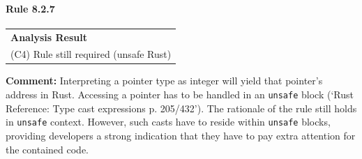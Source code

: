 \paragraph{Rule 8.2.7}
\begin{longtable}{p{13cm}}
\textbf{Analysis Result} \\
(C4) Rule still required (unsafe Rust) \\
\end{longtable}
\textbf{Comment:} Interpreting a pointer type as integer will yield that pointer's address in Rust. Accessing a pointer has to be handled in an \texttt{unsafe} block (`Rust Reference: Type cast expressions p. 205/432'). The rationale of the rule still holds in \texttt{unsafe} context. However, such casts have to reside within \texttt{unsafe} blocks, providing developers a strong indication that they have to pay extra attention for the contained code. \\
